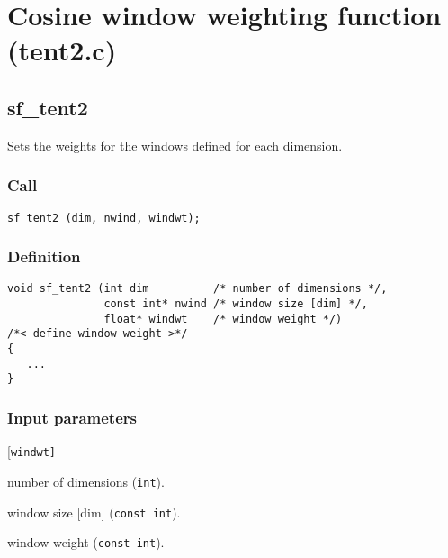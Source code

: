\section{Cosine window weighting function (tent2.c)}




\subsection{{sf\_tent2}}
Sets the weights for the windows defined for each dimension.

\subsubsection*{Call}
\begin{verbatim}sf_tent2 (dim, nwind, windwt);\end{verbatim}

\subsubsection*{Definition}
\begin{verbatim}
void sf_tent2 (int dim          /* number of dimensions */, 
               const int* nwind /* window size [dim] */, 
               float* windwt    /* window weight */)
/*< define window weight >*/
{
   ...
}
\end{verbatim}

\subsubsection*{Input parameters}
\begin{desclist}{\tt }{\quad}[\tt windwt]
   \setlength\itemsep{0pt}
   \item[dim]    number of dimensions (\texttt{int}). 
   \item[nwind]  window size [dim] (\texttt{const int}). 
   \item[windwt] window weight (\texttt{const int}).
\end{desclist}



